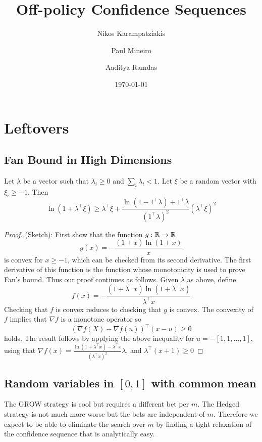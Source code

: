 \documentclass{article}
\title{Off-policy Confidence Sequences}
\author[1]{Nikos Karampatziakis}
\author[1]{Paul Mineiro}
\author[2]{Aaditya Ramdas}
\affil[1]{Microsoft}
\affil[2]{Carnegie Mellon University}
\date{\today}
\begin{document}
\maketitle


\section{Leftovers}
\subsection{Fan Bound in High Dimensions}
Let $\lambda$ be a vector such that $\lambda_i \geq 0$ and
$\sum_i \lambda_i < 1$. Let $\xi$ be a random vector with
$\xi_i \geq -1$. Then
\[
\ln(1+\lambda^\top \xi) \geq \lambda^\top \xi + \frac{\ln(1-1^\top \lambda) +1^\top \lambda}{(1^\top \lambda)^2} (\lambda^\top \xi)^2
\]
\begin{proof}
(Sketch): First show that the function $g:\mathbb{R}\to\mathbb{R}$
\[
g(x) = -\frac{(1+x)\ln(1+x)}{x}
\]
is convex for $x\geq -1$, which can be checked from its second derivative.
The first derivative of this function is the function
whose monotonicity is used to prove Fan's bound. Thus
our proof continues as follows. Given $\lambda$ as above,
define  
\[
f(x) = -\frac{(1+\lambda^\top x)\ln(1+\lambda^\top x)}{\lambda^\top x}
\]
Checking that $f$ is convex reduces to checking that $g$ is convex.
The convexity of $f$ implies that $\nabla f$ is a monotone operator so
\[
(\nabla f(X) - \nabla f(u))^\top (x-u) \geq 0
\]
holds. The result follows by applying the above inequality for 
$u=-[1,1,\ldots,1]$, using that $\nabla f(x)=\frac{\ln(1+\lambda^\top x)-\lambda^\top x}{(\lambda^\top x)^2}\lambda$, and $\lambda^\top (x+1)\geq 0$
\end{proof}


\subsection{Random variables in $[0,1]$ with common mean}
\label{app:nogrid01}
The GROW strategy is cool but requires a different bet per $m$.
The Hedged strategy is not much more worse but the bets are 
independent of $m$. Therefore we expect to be able to eliminate
the search over $m$ by finding a tight relaxation of the 
confidence sequence that is analytically easy.
\end{document}

